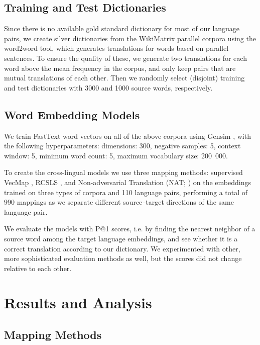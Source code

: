 \documentclass[11pt]{article}
\begin{document}
\subsection{Training and Test Dictionaries}
    Since there is no available gold standard dictionary for most of our language pairs, we create silver dictionaries from the WikiMatrix parallel corpora using the word2word \cite{choe-etal-2020-word2word} tool, which generates translations for words based on parallel sentences. To ensure the quality of these, we generate two translations for each word above the mean frequency in the corpus, and only keep pairs that are mutual translations of each other. Then we randomly select (disjoint) training and test dictionaries with 3000 and 1000 source words, respectively. 

\subsection{Word Embedding Models}
    We train FastText \cite{bojanowski-etal-2017-enriching} word vectors on all of the above corpora using Gensim \cite{rehurek_lrec}, with the following hyperparameters: dimensions: 300, negative samples: 5, context window: 5, minimum word count: 5, maximum vocabulary size: 200~000. 
    
    To create the cross-lingual models we use three mapping methods: supervised VecMap \cite{artetxe2018aaai}, RCSLS \cite{joulin-etal-2018-loss}, and Non-adversarial Translation (NAT; \citealp{hoshen-wolf-2018-non}) on the embeddings trained on three types of corpora and 110 language pairs, performing a total of 990 mappings as we separate different source--target directions of the same language pair.
    
    We evaluate the models with P@1 scores, i.e. by finding the nearest neighbor of a source word among the target language embeddings, and see whether it is a correct translation according to our dictionary. We experimented with other, more sophisticated evaluation methods as well, but the scores did not change relative to each other.

\section{Results and Analysis}

\subsection{Mapping Methods}
 
\end{document}
